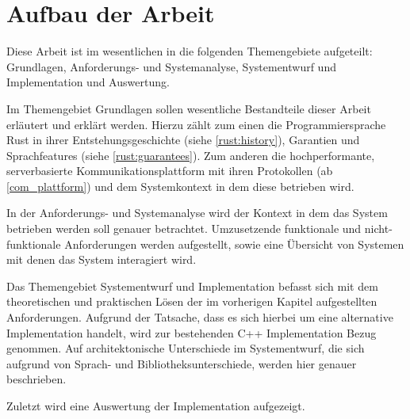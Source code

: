 \section{Aufbau der Arbeit}

Diese Arbeit ist im wesentlichen in die folgenden Themengebiete aufgeteilt: Grundlagen, Anforderungs- und Systemanalyse, Systementwurf und Implementation und Auswertung.

Im Themengebiet Grundlagen sollen wesentliche Bestandteile dieser Arbeit erläutert und erklärt werden.
Hierzu zählt zum einen die Programmiersprache Rust in ihrer Entstehungsgeschichte (siehe \autoref{rust:history}), Garantien  und Sprachfeatures  (siehe \autoref{rust:guarantees}).
Zum anderen die hochperformante, serverbasierte Kommunikationsplattform mit ihren Protokollen (ab \autoref{com_plattform}) und dem Systemkontext in dem diese betrieben wird.

In der Anforderungs- und Systemanalyse wird der Kontext in dem das System betrieben werden soll genauer betrachtet. Umzusetzende funktionale und nicht-funktionale Anforderungen werden aufgestellt, sowie eine Übersicht von Systemen mit denen das System interagiert wird.

Das Themengebiet Systementwurf und Implementation befasst sich mit dem theoretischen und praktischen Lösen der im vorherigen Kapitel aufgestellten Anforderungen. Aufgrund der Tatsache, dass es sich hierbei
um eine alternative Implementation handelt, wird zur bestehenden C++ Implementation Bezug genommen.
Auf architektonische Unterschiede im Systementwurf, die sich aufgrund von Sprach- und Bibliotheksunterschiede, werden hier genauer beschrieben.

Zuletzt wird eine Auswertung der Implementation aufgezeigt.

